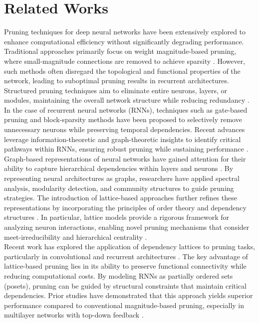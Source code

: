 \section{Related Works}
Pruning techniques for deep neural networks have been extensively explored to enhance computational efficiency without significantly degrading performance. Traditional approaches primarily focus on weight magnitude-based pruning, where small-magnitude connections are removed to achieve sparsity \cite{han2015learning}. However, such methods often disregard the topological and functional properties of the network, leading to suboptimal pruning results in recurrent architectures.\\

Structured pruning techniques aim to eliminate entire neurons, layers, or modules, maintaining the overall network structure while reducing redundancy \cite{narang2017exploring}. In the case of recurrent neural networks (RNNs), techniques such as gate-based pruning \cite{zhang2018systematic} and block-sparsity methods \cite{wen2016learning} have been proposed to selectively remove unnecessary neurons while preserving temporal dependencies. Recent advances leverage information-theoretic and graph-theoretic insights to identify critical pathways within RNNs, ensuring robust pruning while sustaining performance \cite{mocanu2018scalable}.\\

Graph-based representations of neural networks have gained attention for their ability to capture hierarchical dependencies within layers and neurons \cite{wang2019neural}. By representing neural architectures as graphs, researchers have applied spectral analysis, modularity detection, and community structures to guide pruning strategies. The introduction of lattice-based approaches further refines these representations by incorporating the principles of order theory and dependency structures \cite{su2017lattice}. In particular, lattice models provide a rigorous framework for analyzing neuron interactions, enabling novel pruning mechanisms that consider meet-irreducibility and hierarchical centrality \cite{ritter2003lattice}.\\

Recent work has explored the application of dependency lattices to pruning tasks, particularly in convolutional and recurrent architectures \cite{bardella2024lattice}. The key advantage of lattice-based pruning lies in its ability to preserve functional connectivity while reducing computational costs. By modeling RNNs as partially ordered sets (posets), pruning can be guided by structural constraints that maintain critical dependencies. Prior studies have demonstrated that this approach yields superior performance compared to conventional magnitude-based pruning, especially in multilayer networks with top-down feedback \cite{tsotsos2014cognitive, tsotsos2021computational}.\\
